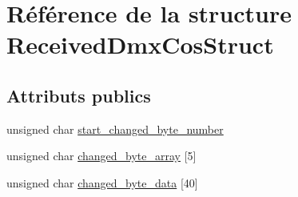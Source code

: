 \hypertarget{struct_received_dmx_cos_struct}{\section{Référence de la structure Received\+Dmx\+Cos\+Struct}
\label{struct_received_dmx_cos_struct}
}
\subsection*{Attributs publics}
\begin{DoxyCompactItemize}
\item 
unsigned char \hyperlink{struct_received_dmx_cos_struct_a4cf39b60236997522f11155b63b2f090}{start\+\_\+changed\+\_\+byte\+\_\+number}
\item 
unsigned char \hyperlink{struct_received_dmx_cos_struct_a863941290eeb0f634dd83aa8a2389718}{changed\+\_\+byte\+\_\+array} \mbox{[}5\mbox{]}
\item 
unsigned char \hyperlink{struct_received_dmx_cos_struct_aa3984590d4af300c37c465375dd7ba0f}{changed\+\_\+byte\+\_\+data} \mbox{[}40\mbox{]}
\end{DoxyCompactItemize}


